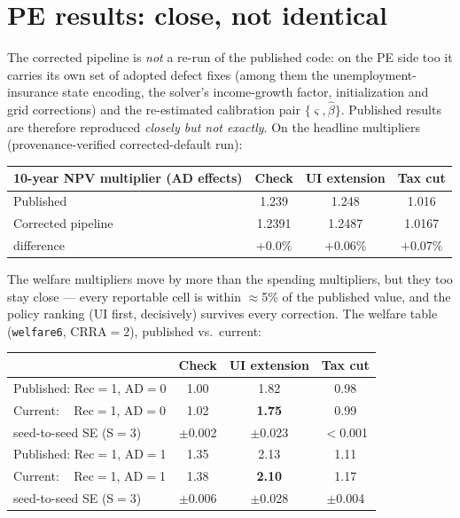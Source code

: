 \documentclass[11pt]{article}
\begin{document}
\section{PE results: close, not identical}
\label{sec:pe}

The corrected pipeline is \emph{not} a re-run of the published code: on
the PE side too it carries its own set of adopted defect fixes (among
them the unemployment-insurance state encoding, the solver's
income-growth factor, initialization and grid corrections) and the
re-estimated calibration pair $\{\varsigma,\hat\beta\}$. Published
results are therefore reproduced \emph{closely but not exactly}. On the
headline multipliers (provenance-verified corrected-default run):

\begin{center}
\begin{tabular}{@{}lccc@{}}
\toprule
10-year NPV multiplier (AD effects) & Check & UI extension & Tax cut \\
\midrule
Published & 1.239 & 1.248 & 1.016 \\
Corrected pipeline & 1.2391 & 1.2487 & 1.0167 \\
\quad difference & $+0.0\%$ & $+0.06\%$ & $+0.07\%$ \\
\bottomrule
\end{tabular}
\end{center}

\noindent The welfare multipliers move by more than the spending
multipliers, but they too stay close --- every reportable cell is
within $\approx$5\% of the published value, and the policy ranking
(UI first, decisively) survives every correction. The welfare table
(\texttt{welfare6}, CRRA$=2$), published vs.\ current:

\begin{center}\small
\begin{tabular}{@{}lccc@{}}
\toprule
 & Check & UI extension & Tax cut \\
\midrule
Published: Rec$=$1, AD$=$0 & 1.00 & 1.82 & 0.98 \\
Current:\ \ \,Rec$=$1, AD$=$0 & 1.02 & \textbf{1.75} & 0.99 \\
\quad seed-to-seed SE (S$=$3) & $\pm$0.002 & $\pm$0.023 & $<$0.001 \\
Published: Rec$=$1, AD$=$1 & 1.35 & 2.13 & 1.11 \\
Current:\ \ \,Rec$=$1, AD$=$1 & 1.38 & \textbf{2.10} & 1.17 \\
\quad seed-to-seed SE (S$=$3) & $\pm$0.006 & $\pm$0.028 & $\pm$0.004 \\
\bottomrule
\end{tabular}
\end{center}
\end{document}
